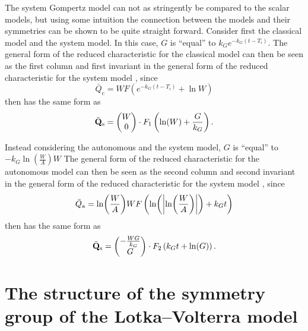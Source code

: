The system Gompertz model can not as stringently be compared to the scalar models, but using some intuition the connection between the models and their symmetries can be shown to be quite straight forward.
Consider first the classical model and the system model.
In this case, \(G\) is \enquote{equal} to \(k_G e^{-k_G (t - T_i)}\).
The general form of the reduced characteristic for the classical model  can then be seen as the first column and first invariant in the general form of the reduced characteristic for the system model , since
\begin{equation}
  \bar{Q}_{\text{c}} = W F\left(e^{-k_G (t - T_i)} + \ln{W}\right)
\end{equation}
then has the same form as
\begin{equation}
  \bar{\vb{Q}}_{\text{s}} =
  \begin{pmatrix}
    W \\
    0
  \end{pmatrix}
  \cdot F_1\left(\ln(W) + \frac{G}{k_G}\right).
\end{equation}

Instead considering the autonomous and the system model, \(G\) is \enquote{equal} to \(-k_G \ln(\frac{W}{A}) W\)
The general form of the reduced characteristic for the autonomous model  can then be seen as the second column and second invariant in the general form of the reduced characteristic for the system model , since
\begin{equation}
  \bar{Q}_{\text{a}} = \ln(\frac{W}{A}) W F\left(\ln(\abs{\ln(\frac{W}{A})}) + k_G t\right)
\end{equation}
then has the same form as
\begin{equation}
  \bar{\vb{Q}}_{\text{s}} =
  \begin{pmatrix}
    - \frac{W G}{k_G} \\
    G
  \end{pmatrix}
  \cdot F_2\left(k_G t + \ln(G)\right).
\end{equation}

\section{The structure of the symmetry group of the Lotka--Volterra model}

